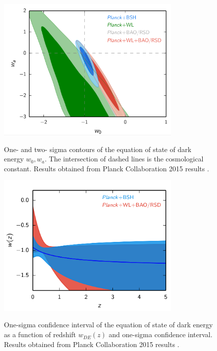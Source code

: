 \begin{figure}
\begin{center}
\includegraphics[width=0.8\textwidth,trim={0 3mm 0 0},clip]{./Pictures/w0wa_planck2015.png}
\caption{One- and two- sigma contours of the equation of state of dark energy $w_0,w_a$. The intersection of dashed lines is the cosmological constant. Results obtained from Planck Collaboration 2015 results \cite{2016A&A...594A..14P}.}
\label{fig:w0wa_planck2015}
\includegraphics[width=0.8\textwidth]{./Pictures/equationofstate_planck2015.png}
\caption{One-sigma confidence interval of the equation of state of dark energy as a function of redshift $w_{DE}(z)$ and one-sigma confidence interval. Results obtained from Planck Collaboration 2015 results \cite{2016A&A...594A..14P}.}
\label{fig:equationofstate_planck2015}
\end{center}
\end{figure}

